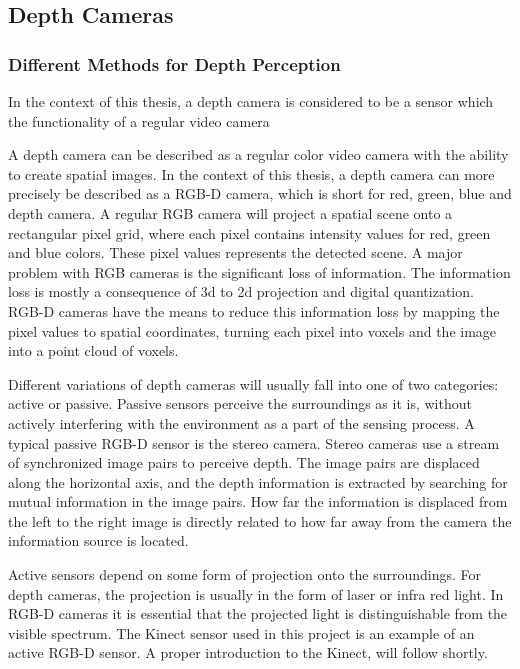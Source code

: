 \subsection{Depth Cameras}

\subsubsection{Different Methods for Depth Perception}

In the context of this thesis, a depth camera is considered to be a sensor which the functionality of a regular video camera 

A depth camera can be described as a regular color video camera with the ability to create spatial images. In the context of this thesis, a depth camera can  more precisely be described as a RGB-D camera, which is short for red, green, blue and depth camera. A regular RGB camera will project a spatial scene onto a rectangular pixel grid, where each pixel contains intensity values for red, green and blue colors. These pixel values represents the detected scene. A major problem with RGB cameras is the significant loss of information. The information loss is mostly a consequence of 3d to 2d projection and digital quantization. RGB-D cameras have the means to reduce this information loss by mapping the pixel values to spatial coordinates, turning each pixel into voxels and the image into a point cloud of voxels. 

Different variations of depth cameras will usually fall into one of two categories: active or passive. Passive sensors perceive the surroundings as it is, without actively interfering with the environment as a part of the sensing process. A typical passive RGB-D sensor is the stereo camera. Stereo cameras use a stream of synchronized image pairs to perceive depth. The image pairs are displaced along the horizontal axis, and the depth information is extracted by searching for mutual information in the image pairs. How far the information is displaced from the left to the right image is directly related to how far away from the camera the information source is located. 

Active sensors depend on some form of projection onto the surroundings. For depth cameras, the projection is usually in the form of laser or infra red light. In RGB-D cameras it is essential that the projected light is distinguishable from the visible spectrum. The Kinect sensor used in this project is an example of an active RGB-D sensor. A proper introduction to the Kinect, will follow shortly.

